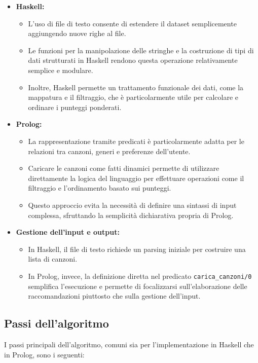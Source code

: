 \documentclass[a4paper,11pt]{article}
\begin{document}
\begin{itemize}
    \item \textbf{Haskell:}
    \begin{itemize}
        \item L’uso di file di testo consente di estendere il dataset semplicemente aggiungendo nuove righe al file.
        \item Le funzioni per la manipolazione delle stringhe e la costruzione di tipi di dati strutturati in Haskell rendono questa operazione relativamente semplice e modulare.
        \item Inoltre, Haskell permette un trattamento funzionale dei dati, come la mappatura e il filtraggio, che è particolarmente utile per calcolare e ordinare i punteggi ponderati.
    \end{itemize}
    \item \textbf{Prolog:}
    \begin{itemize}
        \item La rappresentazione tramite predicati è particolarmente adatta per le relazioni tra canzoni, generi e preferenze dell’utente.
        \item Caricare le canzoni come fatti dinamici permette di utilizzare direttamente la logica del linguaggio per effettuare operazioni come il filtraggio e l’ordinamento basato sui punteggi.
        \item Questo approccio evita la necessità di definire una sintassi di input complessa, sfruttando la semplicità dichiarativa propria di Prolog.
    \end{itemize}
    \item \textbf{Gestione dell’input e output:}
    \begin{itemize}
        \item In Haskell, il file di testo richiede un parsing iniziale per costruire una lista di canzoni.
        \item In Prolog, invece, la definizione diretta nel predicato \texttt{carica\_canzoni/0} semplifica l’esecuzione e permette di focalizzarsi sull’elaborazione delle raccomandazioni piuttosto che sulla gestione dell’input.
    \end{itemize}
\end{itemize}

\newpage
\subsection{Passi dell'algoritmo}
I passi principali dell'algoritmo, comuni sia per l'implementazione in Haskell che in Prolog, sono i seguenti:
\end{document}
